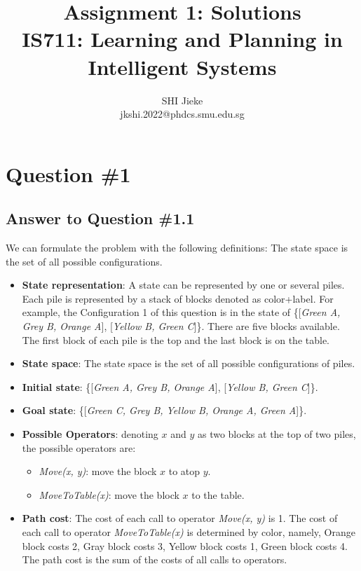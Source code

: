 \documentclass[conference]{styles/acmsiggraph}
\title{Assignment 1: Solutions \\ {IS711: Learning and Planning in Intelligent Systems}}
\author{SHI Jieke \\ jkshi.2022@phdcs.smu.edu.sg}
\begin{document}
\maketitle
\vspace{-0.15cm}
\section{Question \#1}

\subsection{Answer to Question \#1.1}

We can formulate the problem with the following definitions:
The state space is the set of all possible configurations.
\begin{itemize}[itemsep=0.1em, leftmargin=*]
	\setlength{\itemsep}{0pt}
	\setlength{\parsep}{0pt}
	\setlength{\parskip}{0pt}
	\item \textbf{State representation}: A state can be represented by one or several piles. Each pile is represented by a stack of blocks denoted as color+label. For example, the Configuration 1 of this question is in the state of \{[\textit{Green A, Grey B, Orange A}], [\textit{Yellow B, Green C}]\}. There are five blocks available. The first block of each pile is the top and the last block is on the table.
	\item \textbf{State space}: The state space is the set of all possible configurations of piles.
	\item \textbf{Initial state}: \{[\textit{Green A, Grey B, Orange A}], [\textit{Yellow B, Green C}]\}.
	\item \textbf{Goal state}: \{[\textit{Green C, Grey B, Yellow B, Orange A, Green A}]\}.
	\item \textbf{Possible Operators}: denoting $x$ and $y$ as two blocks at the top of two piles, the possible operators are:
	\begin{itemize}
		\item \textit{Move(x, y)}: move the block $x$ to atop $y$.
		\item \textit{MoveToTable(x)}: move the block $x$ to the table.
	\end{itemize}
	\item \textbf{Path cost}: The cost of each call to operator \textit{Move(x, y)} is 1. The cost of each call to operator \textit{MoveToTable(x)} is determined by color, namely, Orange block costs 2, Gray block costs 3, Yellow block costs 1, Green block costs 4. The path cost is the sum of the costs of all calls to operators.
\end{itemize}
\end{document}
